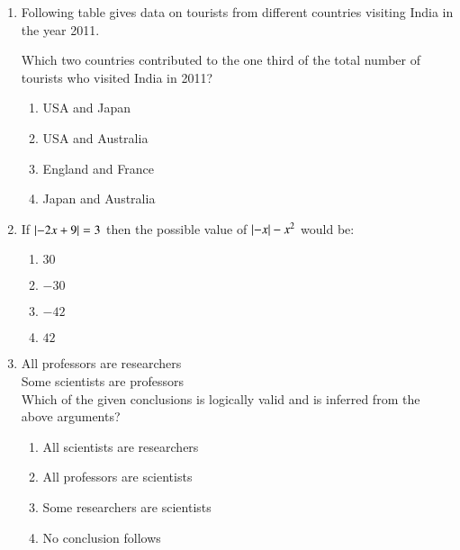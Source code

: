 \documentclass[journal]{IEEEtran}
\begin{document}
\begin{enumerate}
\item \label{Q.63} Following table gives data on tourists from different countries visiting India in the year 2011.

\begin{table}[h!]    
  \centering
  
\end{table}

Which two countries contributed to the one third of the total number of tourists who visited India in 2011?

\begin{enumerate}
    \item USA and Japan
    \item USA and Australia
    \item England and France
    \item Japan and Australia\\
\end{enumerate}

\item \label{Q.64} If $\left\vert -2x + 9 \right\vert = 3$ then the possible value of $\left\vert -x\right\vert - x^2$ would be:

\begin{enumerate}
    \item $30$
    \item $-30$
    \item $-42$
    \item $42$\\
\end{enumerate}
\item \label{Q.65}All professors are researchers\\
Some scientists are professors\\

Which of the given conclusions is logically valid and is inferred from the above arguments?

\begin{enumerate}
    \item All scientists are researchers
    \item All professors are scientists
    \item Some researchers are scientists
    \item No conclusion follows
\end{enumerate}

\end{enumerate}
\end{document}
